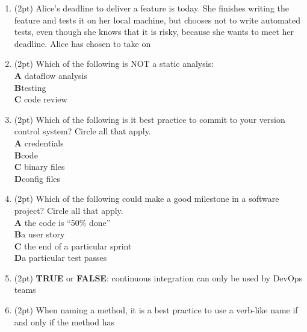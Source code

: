 \documentclass{report}
\newif\ifkey
\newcommand{\correct}[1]{\ifkey\color{red}\textbf{#1}\color{black}\else\textbf{#1}\fi\xspace}
\newcommand{\answershort}[1]{\ifkey\color{red}\underline{\textbf{#1}}\color{black}\else\underline{\hspace{3in}}\fi\xspace}
\newcommand*{\pts}[1]{\addtocounter{points}{#1}(#1pt)}
\begin{document}
\begin{spacing}{1.4}
\begin{enumerate}[leftmargin=*]
\item \pts{2} Alice's deadline to deliver a feature is today. She finishes writing the feature and tests it on her local machine, but chooses not to write automated tests,
  even though she knows that it is risky, because
  she wants to meet her deadline. Alice has chosen to take on \answershort{technical debt}

\item \pts{2}
  Which of the following is NOT a static analysis:
  \\ \textbf{A}\hspace{0.2in} dataflow analysis
  \\ \correct{B}\hspace{0.2in}testing
  \\ \textbf{C}\hspace{0.2in} code review

\item \pts{2}
  Which of the following is it best practice to commit to your version control system? Circle all that apply.
  \\ \textbf{A}\hspace{0.2in} credentials
  \\ \correct{B}\hspace{0.2in}code
  \\ \textbf{C}\hspace{0.2in} binary files
  \\ \correct{D}\hspace{0.2in}config files

\item \pts{2}
  Which of the following could make a good milestone in a software project? Circle all that apply.
  \\ \textbf{A}\hspace{0.2in} the code is ``50\% done''
  \\ \correct{B}\hspace{0.2in}a user story
  \\ \textbf{C}\hspace{0.2in} the end of a particular sprint
  \\ \correct{D}\hspace{0.2in}a particular test passes
  
\item \pts{2}
  \textbf{TRUE} or \correct{FALSE}: continuous integration can only be used by DevOps teams

\item \pts{2}
  When naming a method, it is a best practice to use a verb-like name if and only if the method has \answershort{side-effects}


\end{enumerate}
\end{spacing}
\end{document}
